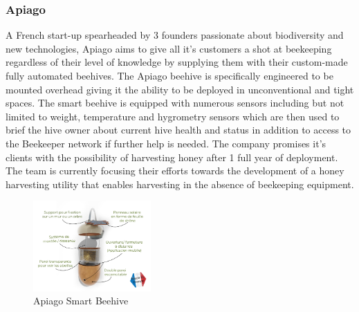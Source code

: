 \documentclass[12pt]{article}
\begin{document}
	\subsubsection{Apiago}
	A French start-up spearheaded by 3 founders passionate about biodiversity and new technologies, Apiago aims to give all it's customers a shot at beekeeping regardless of their level of knowledge by supplying them with their custom-made fully automated beehives\cite{Apiago}. The Apiago beehive is specifically engineered to be mounted overhead giving it the ability to be deployed in unconventional and tight spaces. The smart beehive is equipped with numerous sensors including but not limited to weight, temperature and hygrometry sensors which are then used to brief the hive owner about current hive health and status in addition to access to the Beekeeper network if further help is needed. The company promises it's clients with the possibility of harvesting honey after 1 full year of deployment. The team is currently focusing their efforts towards the development of a honey harvesting utility that enables harvesting in the absence of beekeeping equipment.
	\begin{figure}[H]
		\centering
		\includegraphics[width=0.4\textwidth]{Images/Simillar/rucheConnecteeOuverte.png}
		\caption{Apiago Smart Beehive \cite{Apiago}}
		\label{fig:APIAGO_HIVE}
	\end{figure}
	
\end{document}
